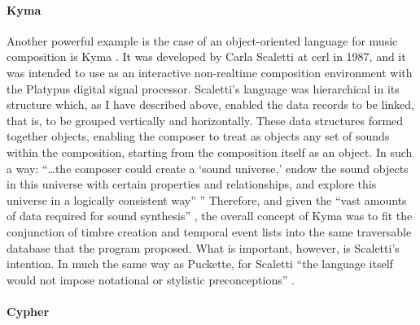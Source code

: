 	\paragraph{Kyma}
	\label{computer:kyma}

	Another powerful example is the case of an object-oriented language for music composition is Kyma \parencite{DBLP:conf/icmc/Scaletti87}. It was developed by Carla Scaletti at \gls{cerl} in 1987, and it was intended to use as an interactive non-realtime composition environment with the Platypus digital signal processor. Scaletti's language was hierarchical in its structure which, as I have described above, enabled the data records to be linked, that is, to be grouped vertically and horizontally. These data structures formed together objects, enabling the composer to treat as objects any set of sounds within the composition, starting from the composition itself as an object. In such a way: ``\dots the composer could create a `sound universe,' endow the sound objects in this universe with certain properties and relationships, and explore this universe in a logically consistent way'' \parencite[50]{DBLP:conf/icmc/Scaletti87}'' Therefore, and given the ``vast amounts of data required for sound synthesis'' \parencite[50]{DBLP:conf/icmc/Scaletti87}, the overall concept of Kyma was to fit the conjunction of timbre creation and temporal event lists into the same traversable database that the program proposed. What is important, however, is Scaletti's intention. In much the same way as Puckette, for Scaletti ``the language itself would not impose notational or stylistic preconceptions'' \parencite[50]{DBLP:conf/icmc/Scaletti87}.

	\paragraph{Cypher}
	\label{computer:cypher}

